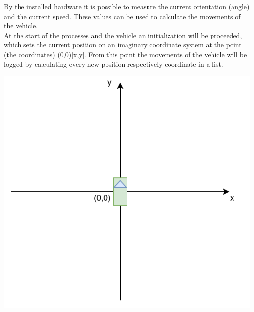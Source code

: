 \begin{minipage}{0.5\textwidth}
By the installed hardware it is possible to measure the current orientation (angle) and the current speed. These values can be used to calculate the movements of the vehicle.\\
At the start of the processes and the vehicle an initialization will be proceeded, which sets the current position on an imaginary coordinate system at the point (the coordinates) (0,0)[x,y]. From this point the movements of the vehicle will be logged by calculating every new position respectively coordinate in a list.
\end{minipage}
\begin{minipage}{0.5\textwidth}
\centering
	\includegraphics[scale=0.6]{sources/mapping/initial_position.pdf}
\end{minipage}

